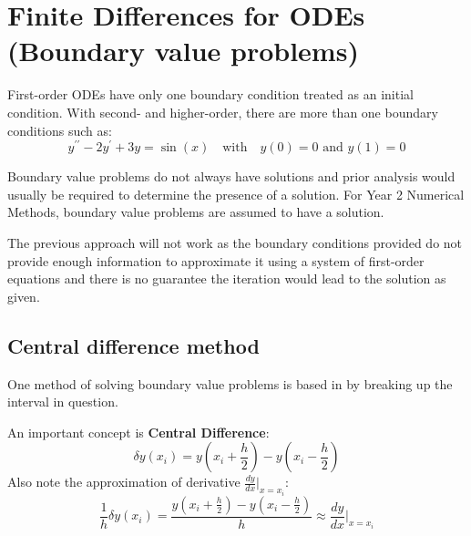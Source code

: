 \documentclass[10pt,a4paper]{article}
\begin{document}
\section{Finite Differences for ODEs (Boundary value problems)}

First-order ODEs have only one boundary condition treated as an initial condition. With second- and
higher-order, there are more than one boundary conditions such as:
$$
    y^{\prime \prime} - 2y^{\prime} + 3y = \sin(x) \quad \text{with} \quad y(0)=0 \text{ and } y(1)=0
$$

Boundary value problems do not always have solutions and prior analysis would usually be required to
determine the presence of a solution. For Year 2 Numerical Methods, boundary value problems are
assumed to have a solution. \par 

The previous approach will not work as the boundary conditions provided do not provide enough
information to approximate it using a system of first-order equations and there is no guarantee the
iteration would lead to the solution as given. \par

\subsection{Central difference method}

One method of solving boundary value problems is based in by breaking up the interval in
question.\par 

An important concept is \textbf{Central Difference}: 
$$
    \delta y(x_i)=y\left(x_i + \frac{h}{2}\right)-y\left(x_i-\frac{h}{2}\right)
$$
Also note the approximation of derivative $\frac{dy}{dx}|_{x=x_i}$:
$$
    \frac{1}{h}\delta y(x_i) = \frac{y\left(x_i + \frac{h}{2}\right)-y\left(x_i-\frac{h}{2}\right)}{h} \approx \frac{dy}{dx}|_{x=x_i}
$$
\end{document}
